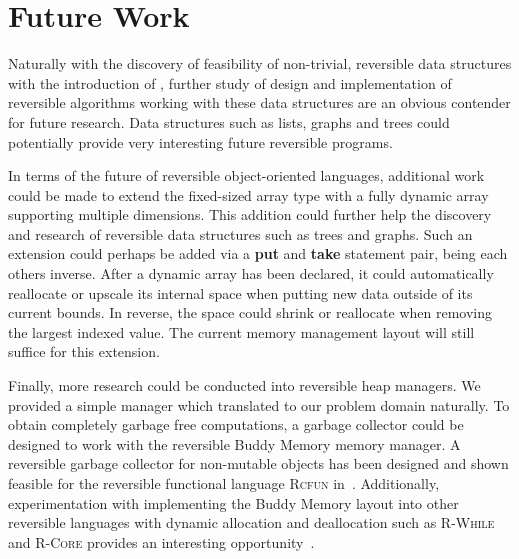 \section{Future Work}
\label{sec:future-work}
Naturally with the discovery of feasibility of non-trivial, reversible data structures with the introduction of \rooplpp, further study of design and implementation of reversible algorithms working with these data structures are an obvious contender for future research. Data structures such as lists, graphs and trees could potentially provide very interesting future reversible programs.

In terms of the future of reversible object-oriented languages, additional work could be made to extend the fixed-sized array type with a fully dynamic array supporting multiple dimensions. This addition could further help the discovery and research of reversible data structures such as trees and graphs. Such an extension could perhaps be added via a \textbf{put} and \textbf{take} statement pair, being each others inverse. After a dynamic array has been declared, it could automatically reallocate or upscale its internal space when putting new data outside of its current bounds. In reverse, the space could shrink or reallocate when removing the largest indexed value. The current memory management layout will still suffice for this extension.

Finally, more research could be conducted into reversible heap managers. We provided a simple manager which translated to our problem domain naturally. To obtain completely garbage free computations, a garbage collector could be designed to work with the reversible Buddy Memory memory manager. A reversible garbage collector for non-mutable objects has been designed and shown feasible for the reversible functional language \textsc{Rcfun} in~\cite{tm:garbage}. Additionally, experimentation with implementing the Buddy Memory layout into other reversible languages with dynamic allocation and deallocation such as \textsc{R-While} and \textsc{R-Core} provides an interesting opportunity~\cite{rg:rwhile, rg:rcore}.
